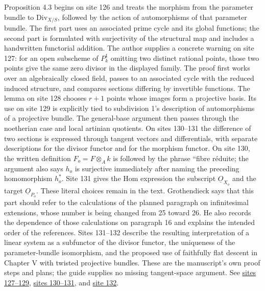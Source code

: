 Proposition 4.3 begins on site 126 and treats the morphism from the parameter bundle to \(\mathrm{Div}_{X/S}\), followed by the action of automorphisms of that parameter bundle. The first part uses an associated prime cycle and its global functions; the second part is formulated with surjectivity of the structural map and includes a handwritten functorial addition. The author supplies a concrete warning on site 127: for an open subscheme of \(P^1_k\) omitting two distinct rational points, those two points give the same zero divisor in the displayed family. The proof first works over an algebraically closed field, passes to an associated cycle with the reduced induced structure, and compares sections differing by invertible functions. The lemma on site 128 chooses \(r+1\) points whose images form a projective basis. Its use on site 129 is explicitly tied to subdivision 1's description of automorphisms of a projective bundle. The general-base argument then passes through the noetherian case and local artinian quotients. On sites 130--131 the difference of two sections is expressed through tangent vectors and differentials, with separate descriptions for the divisor functor and for the morphism functor. On site 130, the written definition \(F_o=F\otimes_A k\) is followed by the phrase ``fibre réduite; the argument also says \(h_o\) is surjective immediately after naming the preceding homomorphism \(h_o^*\). Site 131 gives the Hom expression the subscript \(\underline O_{X_o}\) and the target \(\underline O_{P_o}\). These literal choices remain in the text. Grothendieck says that this part should refer to the calculations of the planned paragraph on infinitesimal extensions, whose number is being changed from 25 toward 26. He also records the dependence of those calculations on paragraph 16 and explains the intended order of the references. Sites 131--132 describe the resulting interpretation of a linear system as a subfunctor of the divisor functor, the uniqueness of the parameter-bundle isomorphism, and the proposed use of faithfully flat descent in Chapter V with twisted projective bundles. These are the manuscript's own proof steps and plans; the guide supplies no missing tangent-space argument. See \href{https://grothendieck.umontpellier.fr/web/viewer.html?file=../25.pdf#page=128}{sites 127--129}, \href{https://grothendieck.umontpellier.fr/web/viewer.html?file=../25.pdf#page=131}{sites 130--131}, and \href{https://grothendieck.umontpellier.fr/web/viewer.html?file=../25.pdf#page=133}{site 132}.


